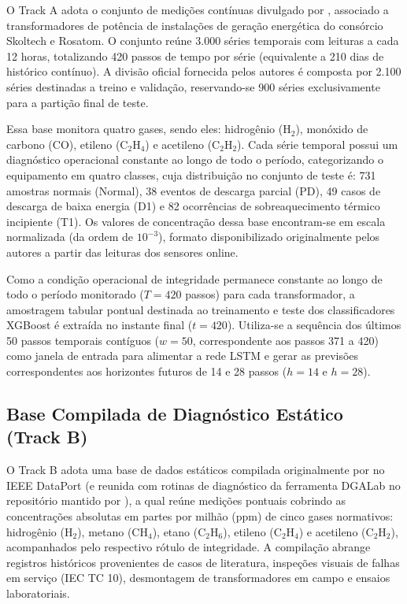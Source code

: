 O Track A adota o conjunto de medições contínuas divulgado por , associado a transformadores de potência de instalações de geração energética do consórcio Skoltech e Rosatom. O conjunto reúne 3.000 séries temporais com leituras a cada 12 horas, totalizando 420 passos de tempo por série (equivalente a 210 dias de histórico contínuo). A divisão oficial fornecida pelos autores é composta por 2.100 séries destinadas a treino e validação, reservando-se 900 séries exclusivamente para a partição final de teste.

Essa base monitora quatro gases, sendo eles: hidrogênio ($\text{H}_2$), monóxido de carbono ($\text{CO}$), etileno ($\text{C}_2\text{H}_4$) e acetileno ($\text{C}_2\text{H}_2$). Cada série temporal possui um diagnóstico operacional constante ao longo de todo o período, categorizando o equipamento em quatro classes, cuja distribuição no conjunto de teste é: 731 amostras normais (Normal), 38 eventos de descarga parcial (PD), 49 casos de descarga de baixa energia (D1) e 82 ocorrências de sobreaquecimento térmico incipiente (T1). Os valores de concentração dessa base encontram-se em escala normalizada (da ordem de $10^{-3}$), formato disponibilizado originalmente pelos autores a partir das leituras dos sensores online.

Como a condição operacional de integridade permanece constante ao longo de todo o período monitorado ($T=420$ passos) para cada transformador, a amostragem tabular pontual destinada ao treinamento e teste dos classificadores XGBoost é extraída no instante final ($t = 420$). Utiliza-se a sequência dos últimos 50 passos temporais contíguos ($w=50$, correspondente aos passos 371 a 420) como janela de entrada para alimentar a rede LSTM e gerar as previsões correspondentes aos horizontes futuros de 14 e 28 passos ($h = 14$ e $h = 28$).

\subsection{Base Compilada de Diagnóstico Estático (Track B)}

O Track B adota uma base de dados estáticos compilada originalmente por  no IEEE DataPort (e reunida com rotinas de diagnóstico da ferramenta DGALab \cite{ibrahim2018_dgalab} no repositório mantido por ), a qual reúne medições pontuais cobrindo as concentrações absolutas em partes por milhão (ppm) de cinco gases normativos: hidrogênio ($\text{H}_2$), metano ($\text{CH}_4$), etano ($\text{C}_2\text{H}_6$), etileno ($\text{C}_2\text{H}_4$) e acetileno ($\text{C}_2\text{H}_2$), acompanhados pelo respectivo rótulo de integridade. A compilação abrange registros históricos provenientes de casos de literatura, inspeções visuais de falhas em serviço (IEC TC 10), desmontagem de transformadores em campo e ensaios laboratoriais.

